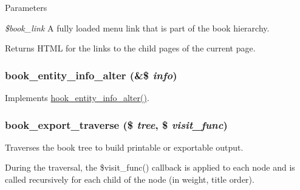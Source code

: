 \begin{DoxyParams}{Parameters}
\item[{\em \$book\_\-link}]A fully loaded menu link that is part of the book hierarchy.\end{DoxyParams}
\begin{DoxyReturn}{Returns}
HTML for the links to the child pages of the current page. 
\end{DoxyReturn}
\hypertarget{book_8module_ad10ea5d5bdad3a6bb77b63a6f1167c4a}{
\subsubsection[{book\_\-entity\_\-info\_\-alter}]{\setlength{\rightskip}{0pt plus 5cm}book\_\-entity\_\-info\_\-alter (\&\$ {\em info})}}
\label{book_8module_ad10ea5d5bdad3a6bb77b63a6f1167c4a}
Implements \hyperlink{group__hooks_ga0394a72e4872603e91ce22440195ab45}{hook\_\-entity\_\-info\_\-alter()}. \hypertarget{book_8module_a3cbdd5e26bcca034837e7a4b04f6641b}{
\subsubsection[{book\_\-export\_\-traverse}]{\setlength{\rightskip}{0pt plus 5cm}book\_\-export\_\-traverse (\$ {\em tree}, \/  \$ {\em visit\_\-func})}}
\label{book_8module_a3cbdd5e26bcca034837e7a4b04f6641b}
Traverses the book tree to build printable or exportable output.

During the traversal, the \$visit\_\-func() callback is applied to each node and is called recursively for each child of the node (in weight, title order).


